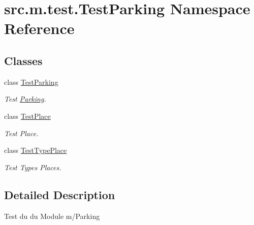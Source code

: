 \hypertarget{namespacesrc_1_1m_1_1test_1_1_test_parking}{}\section{src.\+m.\+test.\+Test\+Parking Namespace Reference}
\label{namespacesrc_1_1m_1_1test_1_1_test_parking}
\subsection*{Classes}
\begin{DoxyCompactItemize}
\item 
class \hyperlink{classsrc_1_1m_1_1test_1_1_test_parking_1_1_test_parking}{Test\+Parking}
\begin{DoxyCompactList}\small\item\em Test \hyperlink{namespacesrc_1_1m_1_1_parking}{Parking}. \end{DoxyCompactList}\item 
class \hyperlink{classsrc_1_1m_1_1test_1_1_test_parking_1_1_test_place}{Test\+Place}
\begin{DoxyCompactList}\small\item\em Test Place. \end{DoxyCompactList}\item 
class \hyperlink{classsrc_1_1m_1_1test_1_1_test_parking_1_1_test_type_place}{Test\+Type\+Place}
\begin{DoxyCompactList}\small\item\em Test Types Places. \end{DoxyCompactList}\end{DoxyCompactItemize}


\subsection{Detailed Description}
\begin{DoxyVerb}    Test du du Module m/Parking
\end{DoxyVerb}
 